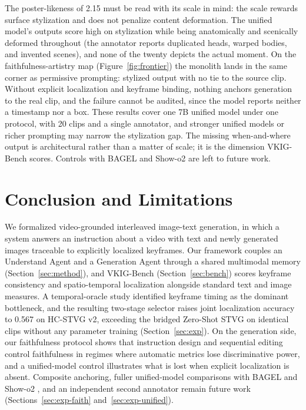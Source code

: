 \documentclass[10pt]{article}
\begin{document}
The poster-likeness of 2.15 must be read with its scale in mind: the scale rewards surface stylization and does not penalize content deformation. The unified model's outputs score high on stylization while being anatomically and scenically deformed throughout (the annotator reports duplicated heads, warped bodies, and invented scenes), and none of the twenty depicts the actual moment. On the faithfulness-artistry map (Figure~\ref{fig:frontier}) the monolith lands in the same corner as permissive prompting: stylized output with no tie to the source clip. Without explicit localization and keyframe binding, nothing anchors generation to the real clip, and the failure cannot be audited, since the model reports neither a timestamp nor a box. These results cover one 7B unified model under one protocol, with 20 clips and a single annotator, and stronger unified models or richer prompting may narrow the stylization gap. The missing when-and-where output is architectural rather than a matter of scale; it is the dimension VKIG-Bench scores. Controls with BAGEL \citep{bagel2505} and Show-o2 \citep{showo22506} are left to future work.


\section{Conclusion and Limitations}
\label{sec:concl}

We formalized video-grounded interleaved image-text generation, in which a system answers an instruction about a video with text and newly generated images traceable to explicitly localized keyframes. Our framework couples an Understand Agent and a Generation Agent through a shared multimodal memory (Section~\ref{sec:method}), and VKIG-Bench (Section~\ref{sec:bench}) scores keyframe consistency and spatio-temporal localization alongside standard text and image measures. A temporal-oracle study identified keyframe timing as the dominant bottleneck, and the resulting two-stage selector raises joint localization accuracy to 0.567 on HC-STVG v2, exceeding the bridged Zero-Shot STVG \citep{zeroshotstvg2509} on identical clips without any parameter training (Section~\ref{sec:exp}). On the generation side, our faithfulness protocol shows that instruction design and sequential editing control faithfulness in regimes where automatic metrics lose discriminative power, and a unified-model control illustrates what is lost when explicit localization is absent. Composite anchoring, fuller unified-model comparisons with BAGEL \citep{bagel2505} and Show-o2 \citep{showo22506}, and an independent second annotator remain future work (Sections~\ref{sec:exp-faith} and~\ref{sec:exp-unified}).
\end{document}
